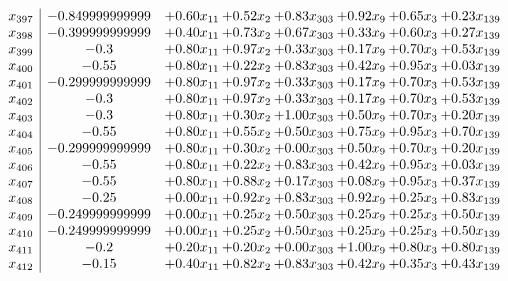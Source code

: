 \documentclass[8pt]{article}
\begin{document}
\[\begin{array}{c| c c@{\hskip 2pt} c@{\hskip 2pt} c@{\hskip 2pt} c@{\hskip 2pt} c@{\hskip 2pt} c@{\hskip 2pt} }
 x_{397}   &  -0.849999999999 & +  0.60 x_{11} & +  0.52 x_{2} & +  0.83 x_{303} & +  0.92 x_{9} & +  0.65 x_{3} & +  0.23 x_{139}\\
 x_{398}   &  -0.399999999999 & +  0.40 x_{11} & +  0.73 x_{2} & +  0.67 x_{303} & +  0.33 x_{9} & +  0.60 x_{3} & +  0.27 x_{139}\\
 x_{399}   &  -0.3 & +  0.80 x_{11} & +  0.97 x_{2} & +  0.33 x_{303} & +  0.17 x_{9} & +  0.70 x_{3} & +  0.53 x_{139}\\
 x_{400}   &  -0.55 & +  0.80 x_{11} & +  0.22 x_{2} & +  0.83 x_{303} & +  0.42 x_{9} & +  0.95 x_{3} & +  0.03 x_{139}\\
 x_{401}   &  -0.299999999999 & +  0.80 x_{11} & +  0.97 x_{2} & +  0.33 x_{303} & +  0.17 x_{9} & +  0.70 x_{3} & +  0.53 x_{139}\\
 x_{402}   &  -0.3 & +  0.80 x_{11} & +  0.97 x_{2} & +  0.33 x_{303} & +  0.17 x_{9} & +  0.70 x_{3} & +  0.53 x_{139}\\
 x_{403}   &  -0.3 & +  0.80 x_{11} & +  0.30 x_{2} & +  1.00 x_{303} & +  0.50 x_{9} & +  0.70 x_{3} & +  0.20 x_{139}\\
 x_{404}   &  -0.55 & +  0.80 x_{11} & +  0.55 x_{2} & +  0.50 x_{303} & +  0.75 x_{9} & +  0.95 x_{3} & +  0.70 x_{139}\\
 x_{405}   &  -0.299999999999 & +  0.80 x_{11} & +  0.30 x_{2} & +  0.00 x_{303} & +  0.50 x_{9} & +  0.70 x_{3} & +  0.20 x_{139}\\
 x_{406}   &  -0.55 & +  0.80 x_{11} & +  0.22 x_{2} & +  0.83 x_{303} & +  0.42 x_{9} & +  0.95 x_{3} & +  0.03 x_{139}\\
 x_{407}   &  -0.55 & +  0.80 x_{11} & +  0.88 x_{2} & +  0.17 x_{303} & +  0.08 x_{9} & +  0.95 x_{3} & +  0.37 x_{139}\\
 x_{408}   &  -0.25 & +  0.00 x_{11} & +  0.92 x_{2} & +  0.83 x_{303} & +  0.92 x_{9} & +  0.25 x_{3} & +  0.83 x_{139}\\
 x_{409}   &  -0.249999999999 & +  0.00 x_{11} & +  0.25 x_{2} & +  0.50 x_{303} & +  0.25 x_{9} & +  0.25 x_{3} & +  0.50 x_{139}\\
 x_{410}   &  -0.249999999999 & +  0.00 x_{11} & +  0.25 x_{2} & +  0.50 x_{303} & +  0.25 x_{9} & +  0.25 x_{3} & +  0.50 x_{139}\\
 x_{411}   &  -0.2 & +  0.20 x_{11} & +  0.20 x_{2} & +  0.00 x_{303} & +  1.00 x_{9} & +  0.80 x_{3} & +  0.80 x_{139}\\
 x_{412}   &  -0.15 & +  0.40 x_{11} & +  0.82 x_{2} & +  0.83 x_{303} & +  0.42 x_{9} & +  0.35 x_{3} & +  0.43 x_{139}\\

\end{array}\]
\end{document}
